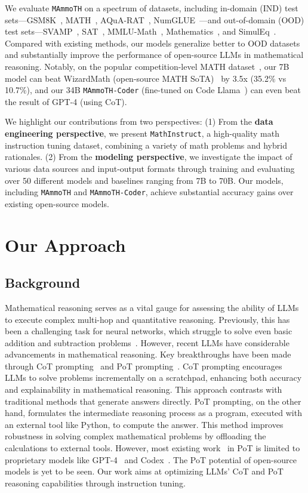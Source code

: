We evaluate \texttt{MAmmoTH} on a spectrum of datasets, including in-domain (IND) test sets---GSM8K~\citep{cobbe2021training}, MATH~\citep{hendrycks2021measuring}, AQuA-RAT~\citep{ling2017program}, NumGLUE~\citep{mishra2022numglue}---and out-of-domain (OOD) test sets---SVAMP~\citep{patel2021nlp}, SAT~\citep{zhong2023agieval}, MMLU-Math~\citep{hendrycks2020measuring}, Mathematics~\citep{davies2021advancing}, and SimulEq~\citep{koncel2016mawps}. Compared with existing methods, our models generalize better to OOD datasets and substantially improve the performance of open-source LLMs in mathematical reasoning. Notably, on the popular competition-level MATH dataset~\citep{hendrycks2021measuring}, our 7B model can beat WizardMath (open-source MATH SoTA)~\citep{luo2023wizardmath} by 3.5x (35.2\% vs 10.7\%), and our 34B \texttt{MAmmoTH-Coder} (fine-tuned on Code Llama~\citep{roziere2023code}) can even beat the result of GPT-4 (using CoT). 

We highlight our contributions from two perspectives: (1) From the \textbf{data engineering perspective}, we present \texttt{MathInstruct}, a high-quality math instruction tuning dataset, combining a variety of math problems and hybrid rationales. (2) From the \textbf{modeling perspective}, we investigate the impact of various data sources and input-output formats through training and evaluating over 50 different models and baselines ranging from 7B to 70B. Our models, including \texttt{MAmmoTH} and \texttt{MAmmoTH-Coder}, achieve substantial accuracy gains over existing open-source models.

\section{Our Approach}
\subsection{Background}
Mathematical reasoning serves as a vital gauge for assessing the ability of LLMs to execute complex multi-hop and quantitative reasoning. Previously, this has been a challenging task for neural networks, which struggle to solve even basic addition and subtraction problems~\citep{yang2023gpt}. However, recent LLMs have considerable advancements in mathematical reasoning. Key breakthroughs have been made through CoT prompting~\citep{wei2022chain,nye2022show} and PoT prompting~\citep{chen2022program,gao2023pal}. CoT prompting encourages LLMs to solve problems incrementally on a scratchpad, enhancing both accuracy and explainability in mathematical reasoning. This approach contrasts with traditional methods that generate answers directly. PoT prompting, on the other hand, formulates the intermediate reasoning process as a program, executed with an external tool like Python, to compute the answer. This method improves robustness in solving complex mathematical problems by offloading the calculations to external tools. However, most existing work~\citep{zhou2023solving} in PoT is limited to proprietary models like GPT-4~\citep{OpenAI2023GPT4TR} and Codex~\citep{chen2021evaluating}. The PoT potential of open-source models is yet to be seen. Our work aims at optimizing LLMs' CoT and PoT reasoning capabilities through instruction tuning.


